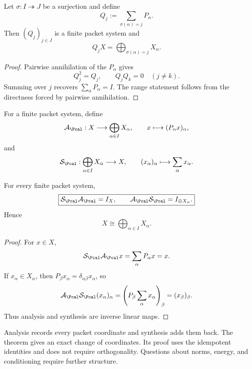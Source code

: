 \begin{lemma}
\label{lem:packet-aggregation}
Let $\sigma:I\twoheadrightarrow J$ be a surjection and define
\[
Q_j:=\sum_{\sigma(\alpha)=j}P_\alpha.
\]
Then $(Q_j)_{j\in J}$ is a finite packet system and
\[
Q_jX=\bigoplus_{\sigma(\alpha)=j}X_\alpha.
\]
\end{lemma}

\begin{proof}
Pairwise annihilation of the $P_\alpha$ gives
\[
Q_j^2=Q_j,
\qquad
Q_jQ_k=0\quad(j\neq k).
\]
Summing over $j$ recovers $\sum_\alpha P_\alpha=I$.  The range statement follows from the directness forced by pairwise annihilation.
\end{proof}

\begin{definition}
\label{def:analysis-synthesis}
For a finite packet system, define
\[
\mathcal A_{\Pcal}:X\longrightarrow\bigoplus_{\alpha\in I}X_\alpha,
\qquad
x\longmapsto(P_\alpha x)_\alpha,
\]
and
\[
\mathcal S_{\Pcal}:\bigoplus_{\alpha\in I}X_\alpha\longrightarrow X,
\qquad
(x_\alpha)_\alpha\longmapsto\sum_\alpha x_\alpha.
\]
\end{definition}

\begin{theorem}
\label{thm:exact-packet-coordinates}
For every finite packet system,
\[
\boxed{
\mathcal S_{\Pcal}\mathcal A_{\Pcal}=I_X,
\qquad
\mathcal A_{\Pcal}\mathcal S_{\Pcal}=I_{\oplus X_\alpha}.
}
\]
Hence
\[
\boxed{X\cong\bigoplus_{\alpha\in I}X_\alpha.}
\]
\end{theorem}

\begin{proof}
For $x\in X$,
\[
\mathcal S_{\Pcal}\mathcal A_{\Pcal}x
=
\sum_\alpha P_\alpha x
=x.
\]
If $x_\alpha\in X_\alpha$, then $P_\beta x_\alpha=\delta_{\alpha\beta}x_\alpha$, so
\[
\mathcal A_{\Pcal}\mathcal S_{\Pcal}(x_\alpha)_\alpha
=
\left(P_\beta\sum_\alpha x_\alpha\right)_\beta
=(x_\beta)_\beta.
\]
Thus analysis and synthesis are inverse linear maps.
\end{proof}

\begin{keyidea}
Analysis records every packet coordinate and synthesis adds them back.  The theorem gives an exact change of coordinates.  Its proof uses the idempotent identities and does not require orthogonality.  Questions about norms, energy, and conditioning require further structure.
\end{keyidea}


